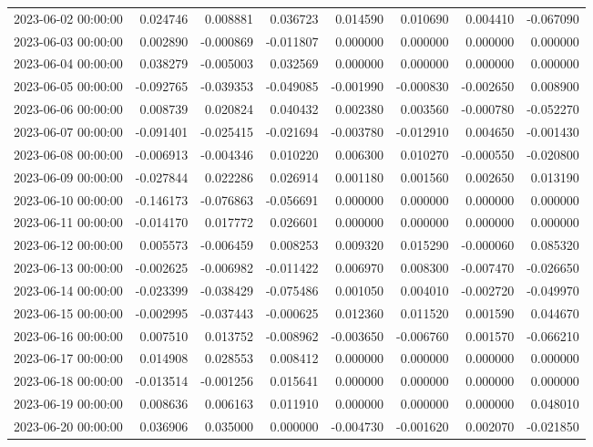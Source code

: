 \begin{tabular}{lrrrrrrr}
2023-06-02 00:00:00 & 0.024746 & 0.008881 & 0.036723 & 0.014590 & 0.010690 & 0.004410 & -0.067090 \\
2023-06-03 00:00:00 & 0.002890 & -0.000869 & -0.011807 & 0.000000 & 0.000000 & 0.000000 & 0.000000 \\
2023-06-04 00:00:00 & 0.038279 & -0.005003 & 0.032569 & 0.000000 & 0.000000 & 0.000000 & 0.000000 \\
2023-06-05 00:00:00 & -0.092765 & -0.039353 & -0.049085 & -0.001990 & -0.000830 & -0.002650 & 0.008900 \\
2023-06-06 00:00:00 & 0.008739 & 0.020824 & 0.040432 & 0.002380 & 0.003560 & -0.000780 & -0.052270 \\
2023-06-07 00:00:00 & -0.091401 & -0.025415 & -0.021694 & -0.003780 & -0.012910 & 0.004650 & -0.001430 \\
2023-06-08 00:00:00 & -0.006913 & -0.004346 & 0.010220 & 0.006300 & 0.010270 & -0.000550 & -0.020800 \\
2023-06-09 00:00:00 & -0.027844 & 0.022286 & 0.026914 & 0.001180 & 0.001560 & 0.002650 & 0.013190 \\
2023-06-10 00:00:00 & -0.146173 & -0.076863 & -0.056691 & 0.000000 & 0.000000 & 0.000000 & 0.000000 \\
2023-06-11 00:00:00 & -0.014170 & 0.017772 & 0.026601 & 0.000000 & 0.000000 & 0.000000 & 0.000000 \\
2023-06-12 00:00:00 & 0.005573 & -0.006459 & 0.008253 & 0.009320 & 0.015290 & -0.000060 & 0.085320 \\
2023-06-13 00:00:00 & -0.002625 & -0.006982 & -0.011422 & 0.006970 & 0.008300 & -0.007470 & -0.026650 \\
2023-06-14 00:00:00 & -0.023399 & -0.038429 & -0.075486 & 0.001050 & 0.004010 & -0.002720 & -0.049970 \\
2023-06-15 00:00:00 & -0.002995 & -0.037443 & -0.000625 & 0.012360 & 0.011520 & 0.001590 & 0.044670 \\
2023-06-16 00:00:00 & 0.007510 & 0.013752 & -0.008962 & -0.003650 & -0.006760 & 0.001570 & -0.066210 \\
2023-06-17 00:00:00 & 0.014908 & 0.028553 & 0.008412 & 0.000000 & 0.000000 & 0.000000 & 0.000000 \\
2023-06-18 00:00:00 & -0.013514 & -0.001256 & 0.015641 & 0.000000 & 0.000000 & 0.000000 & 0.000000 \\
2023-06-19 00:00:00 & 0.008636 & 0.006163 & 0.011910 & 0.000000 & 0.000000 & 0.000000 & 0.048010 \\
2023-06-20 00:00:00 & 0.036906 & 0.035000 & 0.000000 & -0.004730 & -0.001620 & 0.002070 & -0.021850 \\

\end{tabular}
